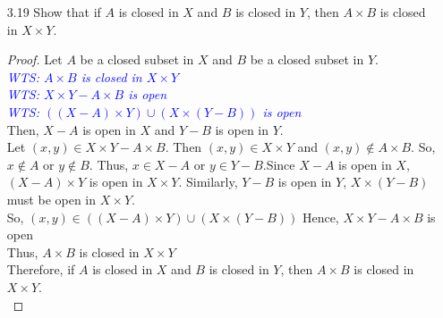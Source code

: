 \documentclass[12pt]{article}
\newcommand{\wts}[1]{\textit{\textcolor{blue}{WTS: #1}}\\}
\begin{document}
\begin{enumerate}
		\item[3.19] Show that if $A$ is closed in $X$ and $B$ is closed in $Y$, then $A \times B$ is closed in $X \times Y$.\\
		
		\begin{proof}
		Let $ A $ be a closed subset in $ X $ and $ B $ be a closed subset in $ Y $.\\
		\wts{$ A\times B $ is closed in $ X\times Y $}	
		\wts{$ X\times Y - A\times B$ is open}
		\wts{$((X-A)\times Y) \cup (X\times (Y - B))$ is open}	
		Then, $ X-A $ is open in $X$ and $ Y-B $ is open in $ Y $.\\
		Let $ (x,y)\in X\times Y - A\times B $. Then $ (x,y)\in X\times Y $ and $ (x,y)\not\in A\times B $. So, $ x \not\in A $ or $ y \not \in B $. Thus, $ x\in X-A $ or $ y\in Y-B $.Since $X-A$ is open in $X$, $ (X-A)\times Y $ is open in $ X\times Y $. Similarly, $ Y-B $ is open in $Y$, $ X\times(Y-B) $ must be open in $ X\times Y $.\\
		So, $ (x,y)\in ((X-A)\times Y)\cup (X\times(Y-B)) $
		Hence, $ X\times Y - A\times B $ is open\\
		Thus, $ A\times B $ is closed in $ X\times Y $\\
		Therefore, if $A$ is closed in $X$ and $B$ is closed in $Y$, then $A \times B$ is closed in $X \times Y$.\\
		\end{proof}
		
	\end{enumerate}
\end{document}
